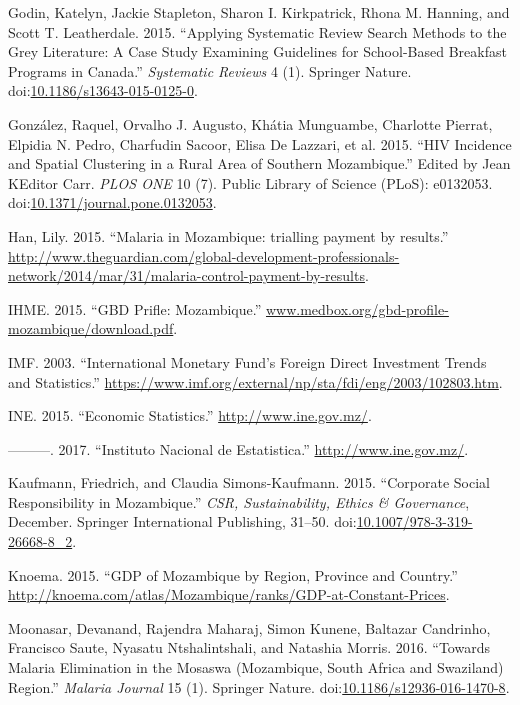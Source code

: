 \documentclass[]{article}
\begin{document}
\hypertarget{ref-Godin2015}{}
Godin, Katelyn, Jackie Stapleton, Sharon I. Kirkpatrick, Rhona M.
Hanning, and Scott T. Leatherdale. 2015. ``Applying Systematic Review
Search Methods to the Grey Literature: A Case Study Examining Guidelines
for School-Based Breakfast Programs in Canada.'' \emph{Systematic
Reviews} 4 (1). Springer Nature.
doi:\href{https://doi.org/10.1186/s13643-015-0125-0}{10.1186/s13643-015-0125-0}.

\hypertarget{ref-Gonz_lez_2015}{}
González, Raquel, Orvalho J. Augusto, Khátia Munguambe, Charlotte
Pierrat, Elpidia N. Pedro, Charfudin Sacoor, Elisa De Lazzari, et al.
2015. ``HIV Incidence and Spatial Clustering in a Rural Area of Southern
Mozambique.'' Edited by Jean KEditor Carr. \emph{PLOS ONE} 10 (7).
Public Library of Science (PLoS): e0132053.
doi:\href{https://doi.org/10.1371/journal.pone.0132053}{10.1371/journal.pone.0132053}.

\hypertarget{ref-Han}{}
Han, Lily. 2015. ``Malaria in Mozambique: trialling payment by
results.''
\url{http://www.theguardian.com/global-development-professionals-network/2014/mar/31/malaria-control-payment-by-results}.

\hypertarget{ref-ihme}{}
IHME. 2015. ``GBD Prifle: Mozambique.''
\url{www.medbox.org/gbd-profile-mozambique/download.pdf}.

\hypertarget{ref-imf}{}
IMF. 2003. ``International Monetary Fund's Foreign Direct Investment
Trends and Statistics.''
\url{https://www.imf.org/external/np/sta/fdi/eng/2003/102803.htm}.

\hypertarget{ref-estatistica}{}
INE. 2015. ``Economic Statistics.'' \url{http://www.ine.gov.mz/}.

\hypertarget{ref-ine}{}
---------. 2017. ``Instituto Nacional de Estatistica.''
\url{http://www.ine.gov.mz/}.

\hypertarget{ref-Kaufmann_2015}{}
Kaufmann, Friedrich, and Claudia Simons-Kaufmann. 2015. ``Corporate
Social Responsibility in Mozambique.'' \emph{CSR, Sustainability, Ethics
\& Governance}, December. Springer International Publishing, 31--50.
doi:\href{https://doi.org/10.1007/978-3-319-26668-8_2}{10.1007/978-3-319-26668-8\_2}.

\hypertarget{ref-knoema}{}
Knoema. 2015. ``GDP of Mozambique by Region, Province and Country.''
\url{http://knoema.com/atlas/Mozambique/ranks/GDP-at-Constant-Prices}.

\hypertarget{ref-Moonasar_2016}{}
Moonasar, Devanand, Rajendra Maharaj, Simon Kunene, Baltazar Candrinho,
Francisco Saute, Nyasatu Ntshalintshali, and Natashia Morris. 2016.
``Towards Malaria Elimination in the Mosaswa (Mozambique, South Africa
and Swaziland) Region.'' \emph{Malaria Journal} 15 (1). Springer Nature.
doi:\href{https://doi.org/10.1186/s12936-016-1470-8}{10.1186/s12936-016-1470-8}.
\end{document}
